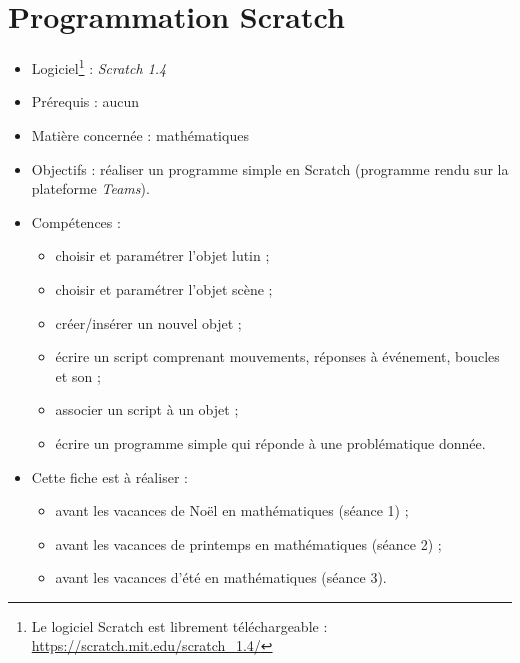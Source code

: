 \chapter{Programmation Scratch}\label{ficheScratch1}  

\begin{itemize}
\item Logiciel\footnote{Le logiciel Scratch est librement téléchargeable : \url{https://scratch.mit.edu/scratch_1.4/}} : \emph{Scratch 1.4}
\item Prérequis : aucun
\item Matière concernée : mathématiques
\item Objectifs : réaliser un programme simple en Scratch (programme rendu sur la plateforme \emph{Teams}).
\item Compétences : 
        \begin{itemize}
        \item choisir et paramétrer l'objet lutin ;
        \item choisir et paramétrer l'objet scène ;
        \item créer/insérer un nouvel objet ; 
        \item écrire un script comprenant mouvements, réponses à événement, boucles et son ;
        \item associer un script à un objet ;
        \item écrire un programme simple qui réponde à une problématique donnée.
        \end{itemize}
\item Cette fiche est à réaliser :
        \begin{itemize}
        \item avant les vacances de Noël en mathématiques (séance 1) ;
        \item avant les vacances de printemps en mathématiques (séance 2)  ;
        \item avant les vacances d'été en mathématiques (séance 3). 
        \end{itemize}
\end{itemize}

















